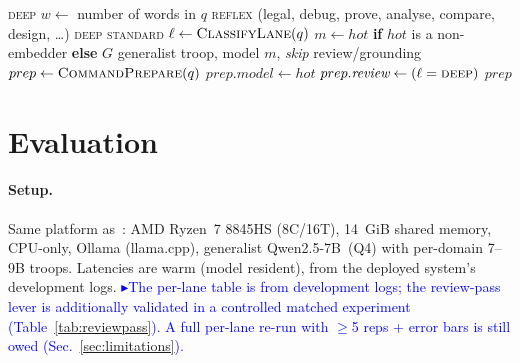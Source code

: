 \documentclass[10pt,twocolumn]{article}
\newcommand{\note}[1]{\textcolor{blue}{\small$\blacktriangleright$#1}}
\begin{document}
\begin{algorithm}[t]
\caption{Effort routing: model-free lane classification (\textsc{ClassifyLane})
and hot-affinity model arbitration (\textsc{RouteEffort}). $G$ is the resident
7B generalist; $hot$ is the currently loaded model ($\varnothing$ if none).}
\label{alg:route}
\small
\begin{algorithmic}[1]
     \State \Return \textsc{deep}
  \EndIf
  \State $w \gets$ number of words in $q$
     \State \Return \textsc{reflex}
  \EndIf
     \Statex \hfill{\footnotesize(legal, debug, prove, analyse, compare, design, \dots)}
     \State \Return \textsc{deep}
  \EndIf
  \State \Return \textsc{standard}
\EndProcedure
\Statex
{}
  \State $\ell \gets \Call{ClassifyLane}{q}$
     \State $m \gets hot$ \textbf{if} $hot$ is a non-embedder \textbf{else} $G$
     \State \Return generalist troop, model $m$, \emph{skip} review/grounding
  \EndIf
  \State $prep \gets \Call{CommandPrepare}{q}$
     \State $prep.\textit{model} \gets hot$
  \EndIf
  \State $prep.\textit{review} \gets (\ell = \textsc{deep})$
  \State \Return $prep$
\EndProcedure
\end{algorithmic}
\end{algorithm}

\section{Evaluation}
\label{sec:eval}

\paragraph{Setup.}
Same platform as~\cite{khan2026prefill}: AMD Ryzen~7 8845HS (8C/16T),
14~GiB shared memory, CPU-only, Ollama (llama.cpp), generalist
Qwen2.5-7B~(Q4) with per-domain 7--9B troops. Latencies are warm
(model resident), from the deployed system's development logs.
\note{The per-lane table is from development logs; the review-pass lever is
additionally validated in a controlled matched experiment
(Table~\ref{tab:reviewpass}). A full per-lane re-run with $\geq$5 reps +
error bars is still owed (Sec.~\ref{sec:limitations}).}
\end{document}
